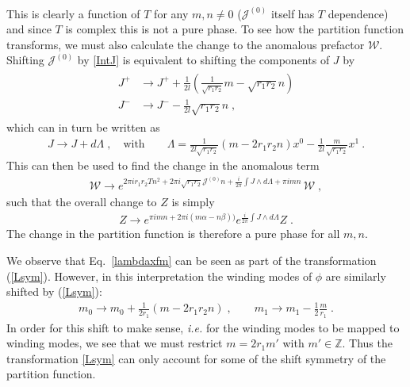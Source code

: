 \documentclass[11pt]{article}
\numberwithin{equation}{section}
\begin{document}
\begin{appendix}
\begin{align}
\end{align}  
This is clearly a function of $T$ for any $m , n \neq 0$ ($\mathcal{J}^{(0)}$ itself has $T$ dependence) and since $T$ is complex this is not a pure phase. To see how the partition function transforms, we must also calculate the change to the anomalous prefactor $\mathcal{W}$. Shifting $\mathcal{J}^{(0)}$ by \eqref{IntJ} is equivalent to shifting the components of $J$ by
\begin{align}
    \begin{split}
    J^{+} &\to J^{+} + \frac{1}{2 l} \left( \frac{1}{\sqrt{r_1 r_2}}m - \sqrt{r_1 r_2} n  \right) \\
    J^{-} &\to J^{-} - \frac{1}{2 l} \sqrt{r_1 r_2} n \;,
    \end{split}
\end{align}
which can in turn be written as 
\begin{align}\label{lambdaxfm}
    J \to J + d \Lambda
    \;, \quad\textrm{with}\qquad \Lambda = \frac{1}{2l\sqrt{r_1r_2}}(m -2r_1r_2n)x^0- \frac{1}{2l}\frac{m}{\sqrt{r_1r_2}}x^1\ .
\end{align}
This can then be used to find the change in the anomalous term
\begin{align}
    \mathcal{W} \to e^{ 2\pi i r_1 r_2 T n^2 + 2 \pi i \sqrt{r_1 r_2} \mathcal{J}^{(0)}n + \frac{i}{2\pi} \int J \wedge d \Lambda  + \pi i m n }\, \mathcal{W} \;,
\end{align}
such that the overall change to $Z$ is simply
\begin{align} \label{phase}
    Z \to e^{\pi imn+ 2\pi i (m \alpha-n\beta))}  e^{\frac{i}{2 \pi} \int J \wedge d\Lambda} Z\;.
\end{align}
The change in the partition function is therefore a pure phase for all $m, n$. 

We observe that Eq.~\eqref{lambdaxfm} can be seen as part of the transformation (\ref{Lsym}). However, in this interpretation the winding modes of $\phi$ are similarly shifted by (\ref{Lsym}):
\begin{align}
m_0\to m_0  +     \frac{1}{2r_1}(m -2r_1r_2n)\;,\qquad m_1 \to m_1 -\frac{1}{2}\frac{m}{r_1}\;.
\end{align}
In order for this shift to make sense, {\it i.e.} for the winding modes to be mapped to winding modes, we see that we must restrict  $m=2r_1m'$ with $m'\in\mathbb Z$. Thus the transformation \eqref{Lsym} can only account for some of the shift symmetry of the partition function. 



\end{appendix}
\end{document}

